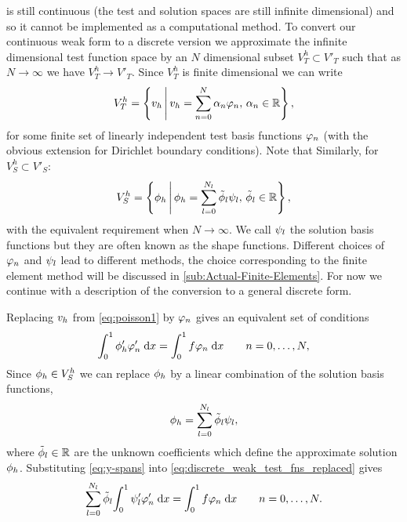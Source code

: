  is still continuous (\ie the test and solution spaces are still infinite dimensional) and so it cannot be implemented as a computational method.
To convert our continuous weak form to a discrete version we approximate the infinite dimensional test function space by an $N$ dimensional subset $V_{T}^{h} \subset V'_T$ such that as $N \rightarrow \infty$ we have $V_{T}^{h} \rightarrow V'_T$.
Since $V_{T}^{h}$ is finite dimensional we can write
\begin{equation}
  V_{T}^{h} = \left\{ {{v}_h } \,\middle|\, { {v}_h = \sum_{n=0}^{N}\alpha_{n} \varphi_{n},\, \alpha_{n} \in \mathbb{R}} \right\},
  \label{eq:30}
\end{equation}
for some finite set of linearly independent test basis functions $\varphi_{n}$ (with the obvious extension for Dirichlet boundary conditions).
Note that
Similarly, for $V_S^h \subset V'_S$:
\begin{equation}
  \label{eq:34}
  V_{S}^{h} = \left\{ {{\phi}_h } \,\middle|\, { {\phi}_h = \sum_{l=0}^{N_l}\tilde{\phi}_l \psi_l,\, \tilde{\phi}_l \in \mathbb{R}} \right\},
\end{equation}
with the equivalent requirement when $N \rightarrow \infty$.
We call $\psi_l$ the solution basis functions but they are often known as the shape functions.
Different choices of $\varphi_{n}$ and $\psi_l$ lead to different methods, the choice corresponding to the finite element method will be discussed in \cref{sub:Actual-Finite-Elements}.
For now we continue with a description of the conversion to a general discrete form.


Replacing ${v}_h$ from \cref{eq:poisson1} by $\varphi_{n}$ gives an equivalent set of conditions
\begin{equation}
  {\int_0^1   \phi'_h \varphi_{n}'   {\; \mathrm{{d}}}{x}}  = {\int_0^1  f\varphi_{n}  {\; \mathrm{{d}}}{x}} \qquad n=0,\ldots,N,
  \label{eq:discrete_weak_test_fns_replaced}
\end{equation}
Since ${\phi}_h\in V_{S}^{h}$ we can replace ${\phi}_h$ by a linear combination of the solution basis functions, \ie
\begin{equation}
  {\phi}_h = \sum_{l=0}^{N_l} \tilde{\phi}_l\psi_l,
  \label{eq:y-spans}
\end{equation}
where $\tilde{\phi}_l \in \mathbb{R}$ are the unknown coefficients which define the approximate solution ${\phi}_h$.
Substituting \cref{eq:y-spans} into \cref{eq:discrete_weak_test_fns_replaced} gives
\begin{equation}
  \sum_{l=0}^{N_l} \tilde{\phi}_l{\int_0^1  \psi_l'\varphi'_{n}  {\; \mathrm{{d}}}{x}} ={\int_0^1  f\varphi_{n}  {\; \mathrm{{d}}}{x}}
  \qquad n=0,\ldots,N.
  \label{eq:31}
\end{equation}

